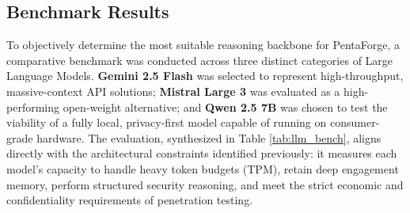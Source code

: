 \documentclass[12pt,a4paper]{report}
\begin{document}
\subsection{Benchmark Results}
To objectively determine the most suitable reasoning backbone for PentaForge, a comparative benchmark was conducted across three distinct categories of Large Language Models. \textbf{Gemini 2.5 Flash} was selected to represent high-throughput, massive-context API solutions; \textbf{Mistral Large 3} was evaluated as a high-performing open-weight alternative; and \textbf{Qwen 2.5 7B} was chosen to test the viability of a fully local, privacy-first model capable of running on consumer-grade hardware. The evaluation, synthesized in Table \ref{tab:llm_bench}, aligns directly with the architectural constraints identified previously: it measures each model's capacity to handle heavy token budgets (TPM), retain deep engagement memory, perform structured security reasoning, and meet the strict economic and confidentiality requirements of penetration testing.
\end{document}
